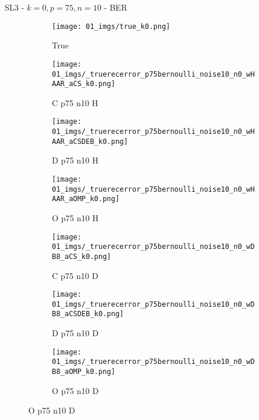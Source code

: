 \begin{frame}{SL3 - $k=0,p=75,n=10$ - BER}{}
\begin{figure}
\begin{subfigure}{0.13\textwidth}
\texttt{[image: 01\_imgs/true\_k0.png]}
\caption*{\tiny True}
\end{subfigure}
\begin{subfigure}{0.13\textwidth}
\texttt{[image: 01\_imgs/\_truerecerror\_p75bernoulli\_noise10\_n0\_wHAAR\_aCS\_k0.png]}
\caption*{\tiny C p75 n10 H}
\end{subfigure}
\begin{subfigure}{0.13\textwidth}
\texttt{[image: 01\_imgs/\_truerecerror\_p75bernoulli\_noise10\_n0\_wHAAR\_aCSDEB\_k0.png]}
\caption*{\tiny D p75 n10 H}
\end{subfigure}
\begin{subfigure}{0.13\textwidth}
\texttt{[image: 01\_imgs/\_truerecerror\_p75bernoulli\_noise10\_n0\_wHAAR\_aOMP\_k0.png]}
\caption*{\tiny O p75 n10 H}
\end{subfigure}
\begin{subfigure}{0.13\textwidth}
\texttt{[image: 01\_imgs/\_truerecerror\_p75bernoulli\_noise10\_n0\_wDB8\_aCS\_k0.png]}
\caption*{\tiny C p75 n10 D}
\end{subfigure}
\begin{subfigure}{0.13\textwidth}
\texttt{[image: 01\_imgs/\_truerecerror\_p75bernoulli\_noise10\_n0\_wDB8\_aCSDEB\_k0.png]}
\caption*{\tiny D p75 n10 D}
\end{subfigure}
\begin{subfigure}{0.13\textwidth}
\texttt{[image: 01\_imgs/\_truerecerror\_p75bernoulli\_noise10\_n0\_wDB8\_aOMP\_k0.png]}
\caption*{\tiny O p75 n10 D}
\end{subfigure}
\end{figure}
\end{frame}

